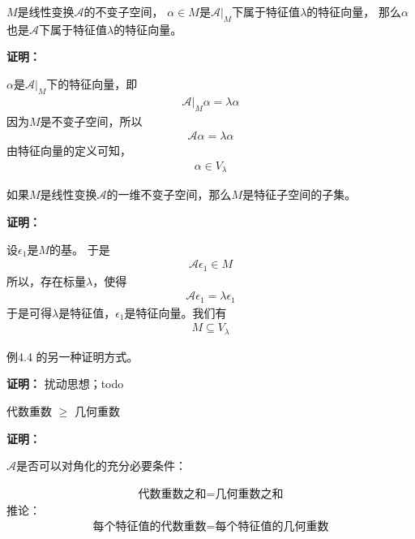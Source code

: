 \documentclass{article}
\begin{document}
\begin{zremark}
  $M$是线性变换$\mathscr{A}$的不变子空间，
  $\alpha \in M$是$\mathscr{A}|_M$下属于特征值$\lambda$的特征向量，
  那么$\alpha$也是$\mathscr{A}$下属于特征值$\lambda$的特征向量。
\end{zremark}

\textbf{证明：}

$\alpha$是$\mathscr{A}|_M$下的特征向量，即
\begin{align*}
  \mathscr{A}|_M \alpha = \lambda \alpha
\end{align*}
因为$M$是不变子空间，所以
\begin{align*}
  \mathscr{A} \alpha = \lambda \alpha
\end{align*}
由特征向量的定义可知，
\begin{align*}
  \alpha \in V_{\lambda}
\end{align*}

\begin{zremark}
  如果$M$是线性变换$\mathscr{A}$的一维不变子空间，那么$M$是特征子空间的子集。
\end{zremark}

\textbf{证明：}

设$\epsilon_1$是$M$的基。
于是
\begin{align*}
  \mathscr{A} \epsilon_1 \in M
\end{align*}
所以，存在标量$\lambda$，使得
\begin{align*}
  \mathscr{A} \epsilon_1 = \lambda \epsilon_1
\end{align*}
于是可得$\lambda$是特征值，$\epsilon_1$是特征向量。我们有
\begin{align*}
  M \subseteq V_\lambda
\end{align*}

\begin{zremark}
  例4.4 的另一种证明方式。
\end{zremark}

\textbf{证明：}
扰动思想；todo

\begin{zremark}
  代数重数 $\geq$ 几何重数
\end{zremark}

\textbf{证明：}

\begin{zremark}
  $\mathscr{A}$是否可以对角化的充分必要条件：

  \begin{align*}
    \textbf{代数重数之和} = \textbf{几何重数之和}
  \end{align*}
  推论：
  \begin{align*}
    \textbf{每个特征值的代数重数} = \textbf{每个特征值的几何重数}
  \end{align*}
\end{zremark}
\end{document}
